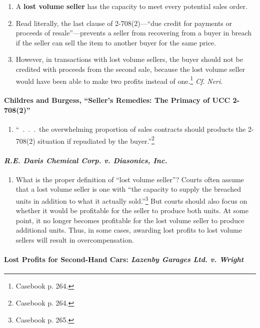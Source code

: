 \begin{enumerate}
    \item A \textbf{lost volume seller} has the capacity to meet every 
    potential sales order.
    \item Read literally, the last clause of 2-708(2)---``due credit for 
    payments or proceeds of resale''---prevents a seller from recovering from 
    a buyer in breach if the seller can sell the item to another buyer for the 
    same price.
    \item However, in transactions with lost volume sellers, the buyer should 
    not be credited with proceeds from the second sale, because the lost 
    volume seller would have been able to make two profits instead of 
    one.\footnote{Casebook p. 264.} \emph{Cf.} \emph{Neri}.
\end{enumerate}

\paragraph{Childres and Burgess, ``Seller's Remedies: The Primacy of UCC 
2-708(2)''}

\begin{enumerate}
    \item ``~.~.~.~the overwhelming proportion of sales contracts should 
    products the 2-708(2) situation if repudiated by the 
    buyer.''\footnote{Casebook p. 264.}
\end{enumerate}

\paragraph{\emph{R.E. Davis Chemical Corp. v. Diasonics, Inc.}}

\begin{enumerate}
    \item What is the proper definition of ``lost volume seller''? Courts 
    often assume that a lost volume seller is one with ``the capacity to 
    supply the breached units in addition to what it actually 
    sold.''\footnote{Casebook p. 265.} But courts should also focus on whether 
    it would be profitable for the seller to produce both units. At some 
    point, it no longer becomes profitable for the lost volume seller to 
    produce additional units. Thus, in some cases, awarding lost profits to 
    lost volume sellers will result in overcompensation.
\end{enumerate}

\paragraph{Lost Profits for Second-Hand Cars: \emph{Lazenby Garages Ltd. v. 
Wright}}

